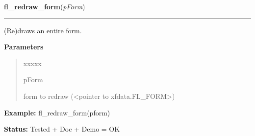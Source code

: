 \hspace{.8\funcindent}\begin{boxedminipage}{\funcwidth}

    \raggedright \textbf{fl\_redraw\_form}(\textit{pForm})

    \vspace{-1.5ex}

    \rule{\textwidth}{0.5\fboxrule}
\setlength{\parskip}{2ex}
    (Re)draws an entire form.

\setlength{\parskip}{1ex}
      \textbf{Parameters}
      \vspace{-1ex}

      \begin{quote}
        \begin{Ventry}{xxxxx}

          \item[pForm]

          form to redraw ({\textless}pointer to 
          xfdata.FL\_FORM{\textgreater})

        \end{Ventry}

      \end{quote}

\textbf{Example:} fl\_redraw\_form(pform)



\textbf{Status:} Tested + Doc + Demo = OK



    \end{boxedminipage}

    \label{xformslib:library:fl_set_form_dblbuffer}

    \vspace{0.5ex}

